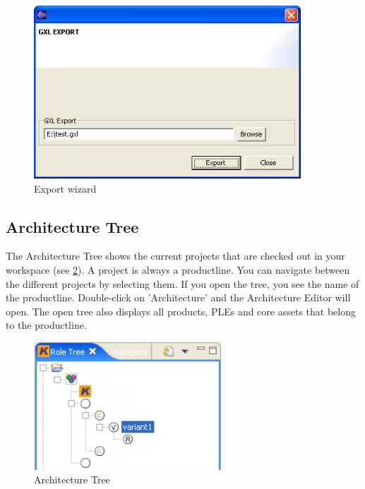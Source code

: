 \begin{figure}[h!]
\begin{center}
\includegraphics[width=10cm]{export.png}
   \caption{Export wizard}
\label{export}
\end{center}
\end{figure}\par







\subsection{Architecture Tree}

The Architecture Tree shows the current projects that are checked out in your workspace 
(see \ref{roletree}).
A project is always a productline. You can navigate between the 
different projects by selecting them. If you open the tree, you see the name
of the productline. Double-click on 'Architecture' and the Architecture Editor will open. The open tree also 
displays all products, PLEs and core assets that belong to the productline.

\begin{figure}[h!]
\begin{center}
\includegraphics[width=7cm]{roletree.png}
   \caption{Architecture Tree}
\label{roletree}
\end{center}
\end{figure}\par

